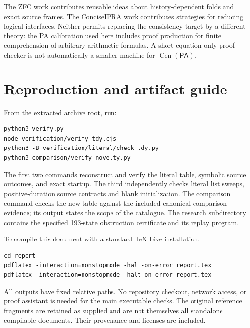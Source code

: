 \documentclass[11pt]{article}
\newcommand{\PA}{\mathsf{PA}}
\newcommand{\Con}{\operatorname{Con}}
\begin{document}
The ZFC work contributes reusable ideas about history-dependent folds and
exact source frames. The ConciseIPRA work contributes strategies for reducing
logical interfaces. Neither permits replacing the consistency target by a
different theory: the PA calibration used here includes proof production for
finite comprehension of arbitrary arithmetic formulas. A short equation-only
proof checker is not automatically a smaller machine for $\Con(\PA)$.

\section{Reproduction and artifact guide}

From the extracted archive root, run:
\begin{Verbatim}[fontsize=\small]
python3 verify.py
node verification/verify_tdy.cjs
python3 -B verification/literal/check_tdy.py
python3 comparison/verify_novelty.py
\end{Verbatim}
The first two commands reconstruct and verify the literal table, symbolic
source outcomes, and exact startup. The third independently checks literal
list sweeps, positive-duration source contracts and blank initialization.
The comparison command checks the new
table against the included canonical comparison evidence; its output states
the scope of the catalogue. The research subdirectory contains the specified
193-state obstruction certificate and its replay program.

To compile this document with a standard TeX Live installation:
\begin{Verbatim}[fontsize=\small]
cd report
pdflatex -interaction=nonstopmode -halt-on-error report.tex
pdflatex -interaction=nonstopmode -halt-on-error report.tex
\end{Verbatim}
All outputs have fixed relative paths. No repository checkout, network access,
or proof assistant is needed for the main executable checks. The original
reference fragments are retained as supplied and are not themselves all
standalone compilable documents. Their provenance and licenses are included.
\end{document}
